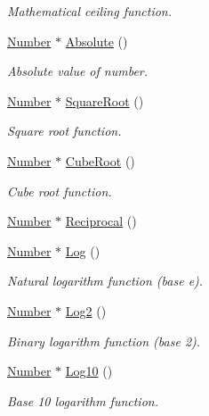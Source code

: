 \begin{DoxyCompactItemize}
\begin{DoxyCompactList}\small\item\em Mathematical ceiling function. \end{DoxyCompactList}\item 
\hyperlink{structNumber}{Number} $\ast$ \hyperlink{structRealNumber_aad63b9d308870c33e3a6eaefb7ceeb8f}{Absolute} ()
\begin{DoxyCompactList}\small\item\em Absolute value of number. \end{DoxyCompactList}\item 
\hyperlink{structNumber}{Number} $\ast$ \hyperlink{structRealNumber_a721d2c6fb9b5f4a5a41de242909ef4da}{Square\+Root} ()
\begin{DoxyCompactList}\small\item\em Square root function. \end{DoxyCompactList}\item 
\hyperlink{structNumber}{Number} $\ast$ \hyperlink{structRealNumber_af20c2032f5c22719a6a8358963feda9a}{Cube\+Root} ()
\begin{DoxyCompactList}\small\item\em Cube root function. \end{DoxyCompactList}\item 
\hyperlink{structNumber}{Number} $\ast$ \hyperlink{structRealNumber_a0254d3b6e1e580f5e95950488c19632d}{Reciprocal} ()
\item 
\hyperlink{structNumber}{Number} $\ast$ \hyperlink{structRealNumber_aaec064f13111dac3cc8e7a33969873a1}{Log} ()
\begin{DoxyCompactList}\small\item\em Natural logarithm function (base e). \end{DoxyCompactList}\item 
\hyperlink{structNumber}{Number} $\ast$ \hyperlink{structRealNumber_a8f0a5ce6092079e47d572b61a05f44f4}{Log2} ()
\begin{DoxyCompactList}\small\item\em Binary logarithm function (base 2). \end{DoxyCompactList}\item 
\hyperlink{structNumber}{Number} $\ast$ \hyperlink{structRealNumber_a75fa4835db911de6541e96895a02a59e}{Log10} ()
\begin{DoxyCompactList}\small\item\em Base 10 logarithm function. \end{DoxyCompactList}\item 

\end{DoxyCompactItemize}
